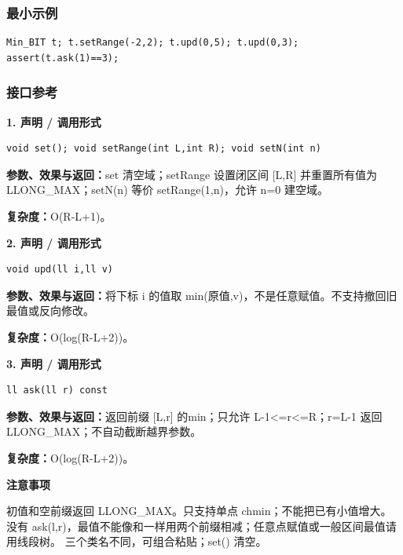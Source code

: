 \documentclass[UTF8,a4paper,10pt]{ctexart}
\newcommand{\TemplNote}[1]{\textbf{注意事项}\par #1\par}
\begin{document}
\subsubsection*{最小示例}
\begin{lstlisting}
Min_BIT t; t.setRange(-2,2); t.upd(0,5); t.upd(0,3);
assert(t.ask(1)==3);
\end{lstlisting}
\subsubsection*{接口参考}
\noindent\begin{minipage}{\textwidth}
\textbf{1. 声明 / 调用形式}
\begin{lstlisting}
void set(); void setRange(int L,int R); void setN(int n)
\end{lstlisting}
\textbf{参数、效果与返回：}set 清空域；setRange 设置闭区间 [L,R] 并重置所有值为 LLONG\_MAX；setN(n) 等价 setRange(1,n)，允许 n=0 建空域。

\textbf{复杂度：}O(R-L+1)。

\end{minipage}\par\vspace{0.4em}
\noindent\begin{minipage}{\textwidth}
\textbf{2. 声明 / 调用形式}
\begin{lstlisting}
void upd(ll i,ll v)
\end{lstlisting}
\textbf{参数、效果与返回：}将下标 i 的值取 min(原值,v)，不是任意赋值。不支持撤回旧最值或反向修改。

\textbf{复杂度：}O(log(R-L+2))。

\end{minipage}\par\vspace{0.4em}
\noindent\begin{minipage}{\textwidth}
\textbf{3. 声明 / 调用形式}
\begin{lstlisting}
ll ask(ll r) const
\end{lstlisting}
\textbf{参数、效果与返回：}返回前缀 [L,r] 的min；只允许 L-1<=r<=R；r=L-1 返回 LLONG\_MAX；不自动截断越界参数。

\textbf{复杂度：}O(log(R-L+2))。

\TemplNote{初值和空前缀返回 LLONG\_MAX。只支持单点 chmin；不能把已有小值增大。没有 ask(l,r)，最值不能像和一样用两个前缀相减；任意点赋值或一般区间最值请用线段树。 三个类名不同，可组合粘贴；set() 清空。}
\end{minipage}\par\vspace{0.4em}
\clearpage
\end{document}
